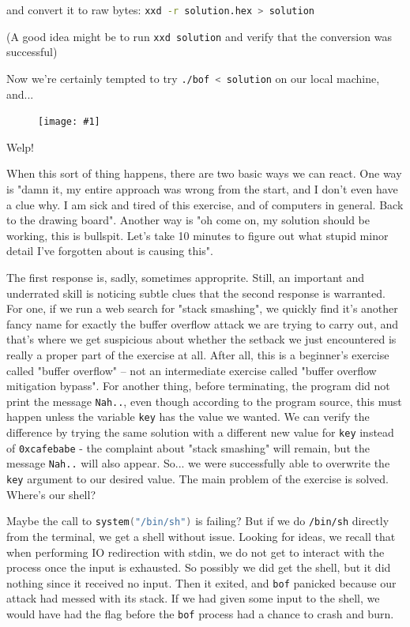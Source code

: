 \documentclass{article}
\newcommand{\displayimage}[1] {
\begin{figure}[H]
    \centering
    \texttt{[image: \#1]} 
\end{figure}
}
\newcommand{\xcode}[2]{\colorbox{ubuntuback}{\lstinline[language=#1]|#2|}}
\newcommand{\code}[1]{\colorbox{ubuntuback}{\texttt{#1}}}
\begin{document}


and convert it to raw bytes: \xcode{bash}{xxd -r solution.hex > solution}

(A good idea might be to run \xcode{bash}{xxd solution} and verify that the conversion was successful)

Now we're certainly tempted to try \xcode{bash}{./bof < solution} on our local machine, and...

\displayimage{../02_bof/local_test.png}

Welp! 

When this sort of thing happens, there are two basic ways we can react. One way is "damn it, my entire approach was wrong from the start, and I don't even have a clue why. I am sick and tired of this exercise, and of computers in general. Back to the drawing board". Another way is "oh come on, my solution should be working, this is bullspit. Let's take 10 minutes to figure out what stupid minor detail I've forgotten about is causing this".

The first response is, sadly, sometimes approprite. Still, an important and underrated skill is noticing subtle clues that the second response is warranted. For one, if we run a web search for "stack smashing", we quickly find it's another fancy name for exactly the buffer overflow attack we are trying to carry out, and that's where we get suspicious about whether the setback we just encountered is really a proper part of the exercise at all. After all, this is a beginner's exercise called "buffer overflow" -- not an intermediate exercise called "buffer overflow mitigation bypass". For another thing, before terminating, the program did not print the message \xcode{bash}{Nah..}, even though according to the program source, this must happen unless the variable \xcode{C}{key} has the value we wanted. We can verify the difference by trying the same solution with a different new value for \xcode{C}{key} instead of \code{0xcafebabe} - the complaint about "stack smashing" will remain, but the message \xcode{bash}{Nah..} will also appear. So... we were successfully able to overwrite the \xcode{C}{key} argument to our desired value. The main problem of the exercise is solved. Where's our shell?

        Maybe the call to \xcode{C}{system("/bin/sh")} is failing? But if we do \xcode{bash}{/bin/sh} directly from the terminal, we get a shell without issue. Looking for ideas, we recall that when performing IO redirection with stdin, we do not get to interact with the process once the input is exhausted. So possibly we did get the shell, but it did nothing since it received no input. Then it exited, and \code{bof} panicked because our attack had messed with its stack. If we had given some input to the shell, we would have had the flag before the \code{bof} process had a chance to crash and burn.
\end{document}
